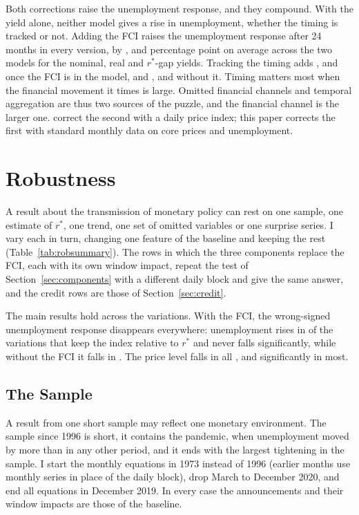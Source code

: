\documentclass[11pt]{article}
\newcommand{\rs}{r^{*}}
\begin{document}


Both corrections raise the unemployment response, and they compound. With the yield alone, neither model gives a rise in unemployment, whether the timing is tracked or not. Adding the FCI raises the unemployment response after 24 months in every version, by ,  and  percentage point on average across the two models for the nominal, real and $\rs$-gap yields. Tracking the timing adds ,  and  once the FCI is in the model, and ,  and  without it. Timing matters most when the financial movement it times is large. Omitted financial channels and temporal aggregation are thus two sources of the puzzle, and the financial channel is the larger one. \citet{jacobson2026} correct the second with a daily price index; this paper corrects the first with standard monthly data on core prices and unemployment.

\FloatBarrier
\section{Robustness}\label{sec:rob}
A result about the transmission of monetary policy can rest on one sample, one estimate of $\rs$, one trend, one set of omitted variables or one surprise series. I vary each in turn, changing one feature of the baseline and keeping the rest (Table~\ref{tab:robsummary}). The rows in which the three components replace the FCI, each with its own window impact, repeat the test of Section~\ref{sec:components} with a different daily block and give the same answer, and the credit rows are those of Section~\ref{sec:credit}.



The main results hold across the variations. With the FCI, the wrong-signed unemployment response disappears everywhere: unemployment rises in  of the  variations that keep the index relative to $\rs$ and never falls significantly, while without the FCI it falls in . The price level falls in all , and significantly in most.

\subsection{The Sample}\label{sec:recent}
A result from one short sample may reflect one monetary environment. The sample since 1996 is short, it contains the pandemic, when unemployment moved by more than in any other period, and it ends with the largest tightening in the sample. I start the monthly equations in 1973 instead of 1996 (earlier months use monthly series in place of the daily block), drop March to December 2020, and end all equations in December 2019. In every case the announcements and their window impacts are those of the baseline.
\end{document}
